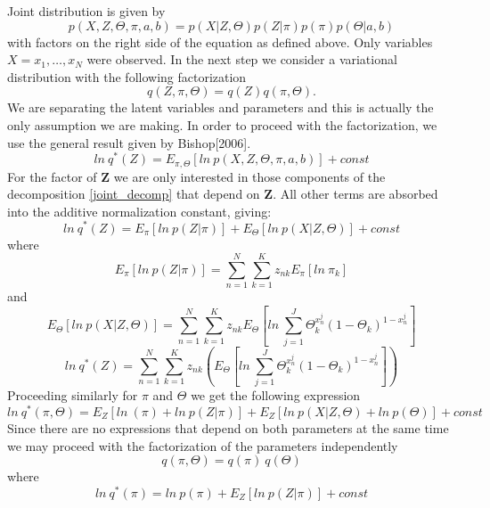 \documentclass{article}
\newcommand\JointProb{p(X,Z,\Theta,\pi,a,b)}
\newcommand\ProbSingleCoin{\Theta_k^{x_n^j}(1-\Theta_k)^{1-x_n^j}}
\newcommand\SumK{\sum_{k=1}^{K}}
\newcommand\SumN{\sum_{n=1}^{N}}
\newcommand\SumJ{\sum_{j=1}^{J}}
\begin{document}
Joint distribution is given by
\begin{equation}\label{joint_decomp}
    \JointProb{} = p(X|Z,\Theta)p(Z|\pi)p(\pi)p(\Theta|a,b)
\end{equation}
with factors on the right side of the equation as defined above. Only variables $X={x_1,\dots,x_N}$ were observed. In the next step we consider a variational distribution with the following factorization
\begin{equation}\label{factor_decomp1}
q(Z, \pi, \Theta) = q(Z)q(\pi,\Theta).
\end{equation}
We are separating the latent variables and parameters and this is actually the only assumption we are making.
In order to proceed with the factorization, we use the general result given by Bishop[2006].
\begin{equation}
    ln\: q^*(Z)=E_{\pi,\Theta}[ln\:\JointProb] + const
\end{equation}
For the factor of \textbf{Z} we are only interested in those components of the decomposition \ref{joint_decomp} that depend on \textbf{Z}. All other terms are absorbed into the additive normalization constant, giving:
\begin{equation}
    ln\: q^*(Z)=E_{\pi}[ln\:p(Z|\pi)] + E_\Theta[ln\:p(X|Z,\Theta)] + const
\end{equation}
where
\begin{equation}
    E_{\pi}[ln\:p(Z|\pi)]  = \SumN\SumK z_{nk}E_\pi[ln\:\pi_k]
\end{equation}
and
\begin{equation}
    E_\Theta[ln\:p(X|Z,\Theta)] = \SumN\SumK z_{nk}E_\Theta[ln\:\SumJ{\ProbSingleCoin}]
\end{equation}
\begin{equation}
    ln\: q^*(Z)=\SumN\SumK z_{nk}\left(E_\Theta[ln\:\SumJ{\ProbSingleCoin}]\right)
\end{equation}
Proceeding similarly for \textbf{$\pi$} and \textbf{$\Theta$} we get the following expression
\begin{equation}
    ln\: q^*(\pi,\Theta)=E_{Z}[ln\:(\pi) + ln\:p(Z|\pi)] + E_Z[ln\:p(X|Z,\Theta) + ln\:p(\Theta)] + const
\end{equation}
Since there are no expressions that depend on both parameters at the same time we may proceed with the factorization of the parameters independently
\begin{equation}\label{factor_decomp2}
    q(\pi,\Theta) = q(\pi)\:q(\Theta)
\end{equation}
where
\begin{equation}
    ln\:q^*(\pi) = ln\:p(\pi) + E_{Z}[ln\:p(Z|\pi)] + const
\end{equation}
\end{document}
